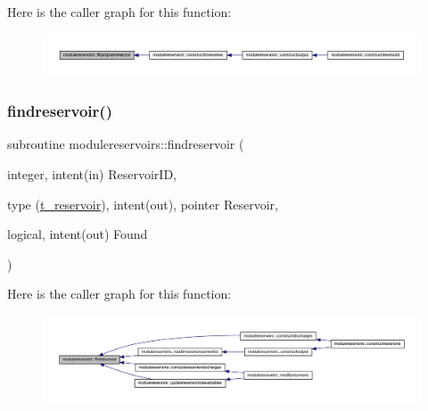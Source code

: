 Here is the caller graph for this function\+:\nopagebreak
\begin{figure}[H]
\begin{center}
\leavevmode
\includegraphics[width=350pt]{namespacemodulereservoirs_a4297360b11f2cc348b2bb6524d4307b9_icgraph}
\end{center}
\end{figure}
\mbox{\label{namespacemodulereservoirs_aaff88903c37ba70d4b309e252229107b}} 
\subsubsection{\texorpdfstring{findreservoir()}{findreservoir()}}
{\footnotesize\ttfamily subroutine modulereservoirs\+::findreservoir (\begin{DoxyParamCaption}\item[{integer, intent(in)}]{Reservoir\+ID,  }\item[{type (\mbox{\hyperlink{structmodulereservoirs_1_1t__reservoir}{t\+\_\+reservoir}}), intent(out), pointer}]{Reservoir,  }\item[{logical, intent(out)}]{Found }\end{DoxyParamCaption})\hspace{0.3cm}{\ttfamily [private]}}

Here is the caller graph for this function\+:\nopagebreak
\begin{figure}[H]
\begin{center}
\leavevmode
\includegraphics[width=350pt]{namespacemodulereservoirs_aaff88903c37ba70d4b309e252229107b_icgraph}
\end{center}
\end{figure}
\mbox{\label{namespacemodulereservoirs_a7e40106c12c54cc753164ac30f0fbf04}} 
